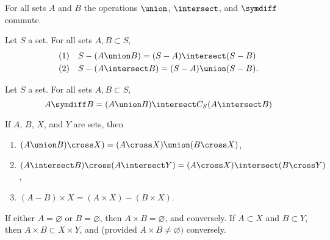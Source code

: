 
\begin{proposition}
  For all sets $A$ and $B$ the operations $\union$, $\intersect$, and $\symdiff$ commute.
\end{proposition}

\begin{proposition}
  Let $S$ a set.
  For all sets $A, B \subset S$,
  \[
    \begin{aligned}
      \text{(1)} \quad & S - (A \union B) = (S - A) \intersect (S - B) \\
      \text{(2)} \quad & S - (A \intersect B) = (S - A) \union (S - B).
    \end{aligned}
  \]
\end{proposition}

\begin{proposition}
  Let $S$ a set. For all sets $A, B \subset S$,
  \[
    A \symdiff B = (A \union B) \intersect C_S(A \intersect B)
  \]
\end{proposition}


If $A$, $B$, $X$, and $Y$ are sets, then
\begin{enumerate}
  \item $(A \union B) \cross X) = (A \cross X) \union (B \cross X)$,
  \item $(A \intersect B) \cross (A \intersect Y) = (A \cross X) \intersect (B \cross Y)$,
  \item $(A - B) \times X = (A \times X) - (B \times X)$.
\end{enumerate}
	If either $A = \varnothing$ or $B = \varnothing$, then $A \times B = \varnothing$, and conversely.
	If $A \subset X$ and $B \subset Y$, then $A \times B \subset X \times Y$, and (provided $A \times B \neq \varnothing)$ conversely.
